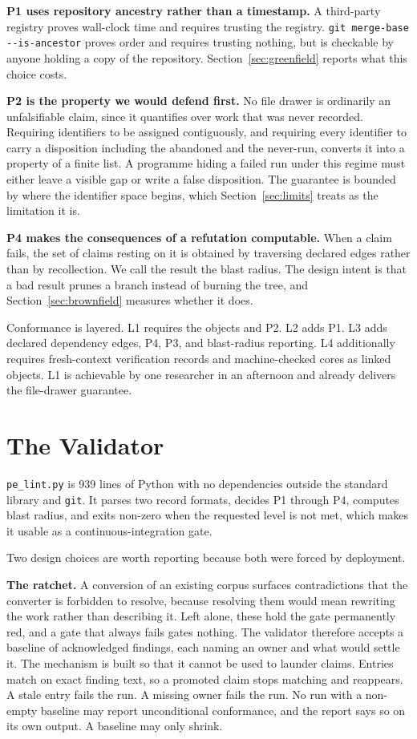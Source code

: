 \documentclass[journal]{IEEEtran}
\begin{document}
\textbf{P1 uses repository ancestry rather than a timestamp.} A third-party
registry proves wall-clock time and requires trusting the registry.
\texttt{git merge-base -{}-is-ancestor} proves order and requires trusting
nothing, but is checkable by anyone holding a copy of the repository.
Section~\ref{sec:greenfield} reports what this choice costs.

\textbf{P2 is the property we would defend first.} No file drawer is ordinarily
an unfalsifiable claim, since it quantifies over work that was never recorded.
Requiring identifiers to be assigned contiguously, and requiring every
identifier to carry a disposition including the abandoned and the never-run,
converts it into a property of a finite list. A programme hiding a failed run
under this regime must either leave a visible gap or write a false disposition.
The guarantee is bounded by where the identifier space begins, which
Section~\ref{sec:limits} treats as the limitation it is.

\textbf{P4 makes the consequences of a refutation computable.} When a claim
fails, the set of claims resting on it is obtained by traversing declared edges
rather than by recollection. We call the result the blast radius. The design
intent is that a bad result prunes a branch instead of burning the tree, and
Section~\ref{sec:brownfield} measures whether it does.

Conformance is layered. L1 requires the objects and P2. L2 adds P1. L3 adds
declared dependency edges, P4, P3, and blast-radius reporting. L4 additionally
requires fresh-context verification records and machine-checked cores as linked
objects. L1 is achievable by one researcher in an afternoon and already delivers
the file-drawer guarantee.

\section{The Validator}

\texttt{pe\_lint.py} is 939 lines of Python with no dependencies outside the
standard library and \texttt{git}. It parses two record formats, decides P1
through P4, computes blast radius, and exits non-zero when the requested level is
not met, which makes it usable as a continuous-integration gate.

Two design choices are worth reporting because both were forced by deployment.

\textbf{The ratchet.} A conversion of an existing corpus surfaces
contradictions that the converter is forbidden to resolve, because resolving
them would mean rewriting the work rather than describing it. Left alone, these
hold the gate permanently red, and a gate that always fails gates nothing. The
validator therefore accepts a baseline of acknowledged findings, each naming an
owner and what would settle it. The mechanism is built so that it cannot be used
to launder claims. Entries match on exact finding text, so a promoted claim stops
matching and reappears. A stale entry fails the run. A missing owner fails the
run. No run with a non-empty baseline may report unconditional conformance, and
the report says so on its own output. A baseline may only shrink.
\end{document}
